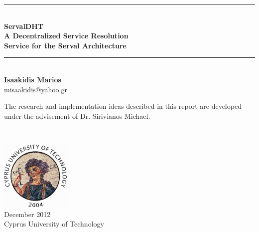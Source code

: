 \begin{titlepage}

\begin{center}

\newcommand{\HRule}{\rule{\linewidth}{0.5mm}}



\HRule \\[0.5cm]
{ \LARGE \bfseries {\huge ServalDHT} \\[0.2cm] A Decentralized Service Resolution\\[0.2cm]Service for the Serval Architecture}\\[0.5cm]

\HRule \\[1cm]

{\LARGE \bf
Isaakidis Marios\\
}
misaakidis@yahoo.gr

\vfill

{\large
The research and implementation ideas described in this report are developed under the advisement of Dr. Sirivianos Michael.}
\end{center}
 ~\\[1.5cm]
\begin{flushright}
\includegraphics[width=0.25\textwidth]{./cut-logo-2}\\ 
{\large
December 2012 \\
Cyprus University of Technology
}
\end{flushright}

\end{titlepage}
